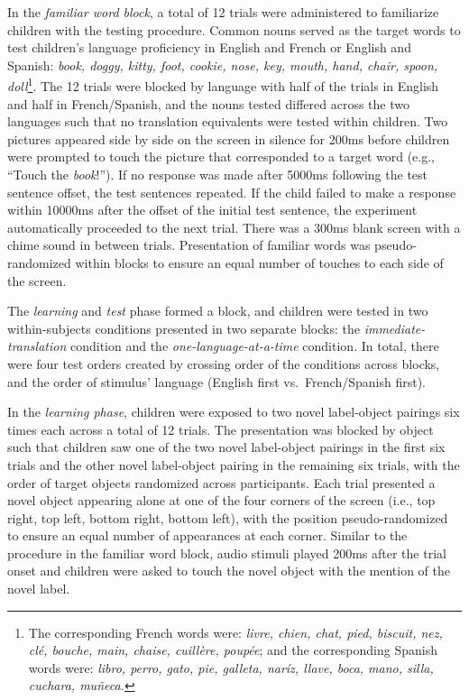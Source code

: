 \documentclass[
  man,floatsintext]{apa7}
\begin{document}
In the \emph{familiar word block}, a total of 12 trials were administered to familiarize children with the testing procedure. Common nouns served as the target words to test children's language proficiency in English and French or English and Spanish: \emph{book, doggy, kitty, foot, cookie, nose, key, mouth, hand, chair, spoon, doll}\footnote{The corresponding French words were: \emph{livre, chien, chat, pied, biscuit, nez, clé, bouche, main, chaise, cuillère, poupée}; and the corresponding Spanish words were: \emph{libro, perro, gato, pie, galleta, naríz, llave, boca, mano, silla, cuchara, muñeca.}}. The 12 trials were blocked by language with half of the trials in English and half in French/Spanish, and the nouns tested differed across the two languages such that no translation equivalents were tested within children. Two pictures appeared side by side on the screen in silence for 200ms before children were prompted to touch the picture that corresponded to a target word (e.g., ``Touch the \emph{book}!''). If no response was made after 5000ms following the test sentence offset, the test sentences repeated. If the child failed to make a response within 10000ms after the offset of the initial test sentence, the experiment automatically proceeded to the next trial. There was a 300ms blank screen with a chime sound in between trials. Presentation of familiar words was pseudo-randomized within blocks to ensure an equal number of touches to each side of the screen.

The \emph{learning} and \emph{test} phase formed a block, and children were tested in two within-subjects conditions presented in two separate blocks: the \emph{immediate-translation} condition and the \emph{one-language-at-a-time} condition. In total, there were four test orders created by crossing order of the conditions across blocks, and the order of stimulus' language (English first vs.~French/Spanish first).

In the \emph{learning phase}, children were exposed to two novel label-object pairings six times each across a total of 12 trials. The presentation was blocked by object such that children saw one of the two novel label-object pairings in the first six trials and the other novel label-object pairing in the remaining six trials, with the order of target objects randomized across participants. Each trial presented a novel object appearing alone at one of the four corners of the screen (i.e., top right, top left, bottom right, bottom left), with the position pseudo-randomized to ensure an equal number of appearances at each corner. Similar to the procedure in the familiar word block, audio stimuli played 200ms after the trial onset and children were asked to touch the novel object with the mention of the novel label.
\end{document}
